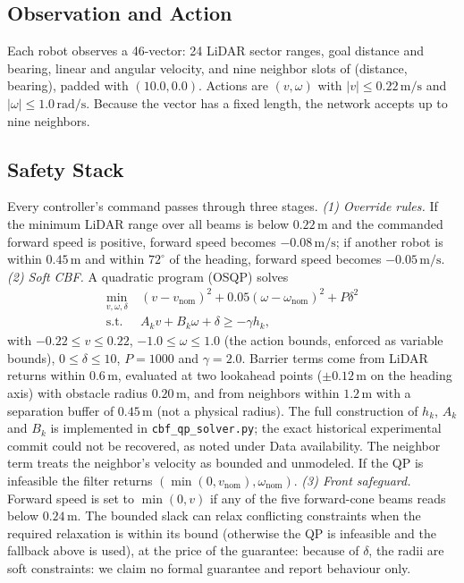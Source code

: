 \documentclass[conference]{IEEEtran}
\newcommand{\si}[1]{\mathrm{#1}}
\begin{document}
\subsection{Observation and Action}
Each robot observes a 46-vector: 24 LiDAR sector ranges, goal distance and
bearing, linear and angular velocity, and nine neighbor slots of (distance,
bearing), padded with $(10.0,0.0)$. Actions are $(v,\omega)$ with
$|v|\le0.22\,\si{m/s}$ and $|\omega|\le1.0\,\si{rad/s}$. Because the vector has
a fixed length, the network accepts up to nine neighbors.

\subsection{Safety Stack}
\label{sec:safety}
Every controller's command passes through three stages.
\emph{(1) Override rules.} If the minimum LiDAR range over all beams is below
$0.22\,\si{m}$ and the commanded forward speed is positive, forward speed
becomes $-0.08\,\si{m/s}$; if another robot is within $0.45\,\si{m}$ and within
$72^\circ$ of the heading, forward speed becomes $-0.05\,\si{m/s}$.
\emph{(2) Soft CBF.} A quadratic program (OSQP) solves
\begin{equation}
\begin{aligned}\min_{v,\omega,\delta}\ &(v-v_{\text{nom}})^2+0.05(\omega-\omega_{\text{nom}})^2+P\delta^2\\ \text{s.t.}\ &A_kv+B_k\omega+\delta\ge-\gamma h_k,\end{aligned}
\end{equation}
with $-0.22\le v\le0.22$, $-1.0\le\omega\le1.0$ (the action bounds, enforced as variable bounds), $0\le\delta\le10$, $P=1000$ and $\gamma=2.0$. Barrier terms come from LiDAR
returns within $0.6\,\si{m}$, evaluated at two lookahead points ($\pm0.12\,\si{m}$
on the heading axis) with obstacle radius $0.20\,\si{m}$, and from neighbors
within $1.2\,\si{m}$ with a separation buffer of $0.45\,\si{m}$ (not a physical radius). The full construction of $h_k$, $A_k$ and $B_k$ is implemented in \texttt{cbf\_qp\_solver.py}; the exact historical experimental commit could not be recovered, as noted under Data availability. The neighbor term treats
the neighbor's velocity as bounded and unmodeled. If the QP is infeasible the
filter returns $(\min(0,v_{\text{nom}}),\omega_{\text{nom}})$.
\emph{(3) Front safeguard.} Forward speed is set to $\min(0,v)$ if any of the
five forward-cone beams reads below $0.24\,\si{m}$.
The bounded slack can relax conflicting constraints when the required relaxation is within its bound (otherwise the QP is infeasible and the fallback above is used), at the price of the guarantee: because of $\delta$, the radii are soft constraints: we claim no
formal guarantee and report behaviour only.
\end{document}
